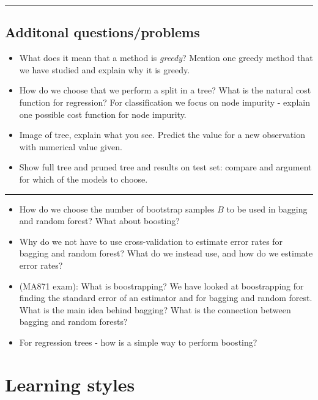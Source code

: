 \documentclass[]{article}
\providecommand{\tightlist}{%
  \setlength{\itemsep}{0pt}\setlength{\parskip}{0pt}}
\begin{document}
\begin{center}\rule{0.5\linewidth}{\linethickness}\end{center}

\subsection{Additonal
questions/problems}\label{additonal-questionsproblems}

\begin{itemize}
\tightlist
\item
  What does it mean that a method is \emph{greedy}? Mention one greedy
  method that we have studied and explain why it is greedy.
\item
  How do we choose that we perform a split in a tree? What is the
  natural cost function for regression? For classification we focus on
  node impurity - explain one possible cost function for node impurity.
\item
  Image of tree, explain what you see. Predict the value for a new
  observation with numerical value given.
\item
  Show full tree and pruned tree and results on test set: compare and
  argument for which of the models to choose.
\end{itemize}

\begin{center}\rule{0.5\linewidth}{\linethickness}\end{center}

\begin{itemize}
\tightlist
\item
  How do we choose the number of bootstrap samples \(B\) to be used in
  bagging and random forest? What about boosting?
\item
  Why do we not have to use cross-validation to estimate error rates for
  bagging and random forest? What do we instead use, and how do we
  estimate error rates?
\item
  (MA871 exam): What is boostrapping? We have looked at boostrapping for
  finding the standard error of an estimator and for bagging and random
  forest. What is the main idea behind bagging? What is the connection
  between bagging and random forests?
\item
  For regression trees - how is a simple way to perform boosting?
\end{itemize}

\section{Learning styles}\label{learning-styles}
\end{document}
